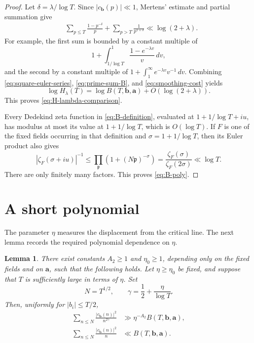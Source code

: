 \documentclass[11pt]{amsart}
\numberwithin{equation}{section}
\theoremstyle{plain}
\newtheorem{lem}{Lemma}[section]
\renewcommand{\le}{\leqslant}
\renewcommand{\ge}{\geqslant}
\begin{document}
\begin{proof}
Let $\delta=\lambda/\log T$.  Since
$|c_{\mathbf b}(p)|\ll1$, Mertens' estimate and partial summation give
\begin{align}
&\sum_{p\le T}\frac{1-p^{-\delta}}p
+\sum_{p>T}\frac1{p^{1+\delta}}
\ll \log(2+\lambda).                                    \label{eq:smoothing-cost}
\end{align}
For example, the first sum is bounded by a constant multiple of
\begin{equation*}
1+\int_{1/\log T}^{1}\frac{1-e^{-\lambda v}}v\,dv,
\end{equation*}
and the second by a constant multiple of
$1+\int_1^\infty e^{-\lambda v}v^{-1}\,dv$.
Combining \eqref{eq:square-euler-series}, \eqref{eq:prime-sum-B}, and
\eqref{eq:smoothing-cost} yields
\begin{equation*}
\log H_\lambda(T)
=\log B(T,\mathbf b,\mathbf a)
+O(\log(2+\lambda)).
\end{equation*}
This proves \eqref{eq:H-lambda-comparison}.

Every Dedekind zeta function in \eqref{eq:B-definition}, evaluated at
$1+1/\log T+iu$, has modulus at most its value at
$1+1/\log T$, which is $O(\log T)$.  If $F$ is one of the fixed fields
occurring in that definition and $\sigma=1+1/\log T$, then its Euler
product also gives
\begin{equation*}
|\zeta_F(\sigma+iu)|^{-1}
\le \prod_{\mathfrak p}\left(1+(N\mathfrak p)^{-\sigma}\right)
=\frac{\zeta_F(\sigma)}{\zeta_F(2\sigma)}
\ll\log T.
\end{equation*}
There are only finitely many factors.  This proves \eqref{eq:B-poly}.
\end{proof}

\section{A short polynomial}\label{sec:short-polynomial}

The parameter $\eta$ measures the displacement from the critical line.  The
next lemma records the required polynomial dependence on $\eta$.

\begin{lem}\label{lem:coefficient-truncation}
There exist constants $A_2\ge1$ and $\eta_0\ge1$, depending only on
the fixed fields and on $\mathbf a$, such that the following
holds.  Let $\eta\ge\eta_0$ be fixed, and suppose that $T$ is sufficiently
large in terms of $\eta$.  Set
\begin{equation}\label{eq:N-gamma}
N=T^{1/2},\qquad \gamma=\frac12+\frac{\eta}{\log T}.
\end{equation}
Then, uniformly for $|b_i|\le T/2$,
\begin{align}
\sum_{n\le N}\frac{|c_{\mathbf b}(n)|^2}{n^{2\gamma}}
&\gg \eta^{-A_2}B(T,\mathbf b,\mathbf a), \label{eq:truncated-lower}\\
\sum_{n\le N}\frac{|c_{\mathbf b}(n)|^2}{n}
&\ll B(T,\mathbf b,\mathbf a).                 \label{eq:truncated-upper}
\end{align}
\end{lem}
\end{document}
